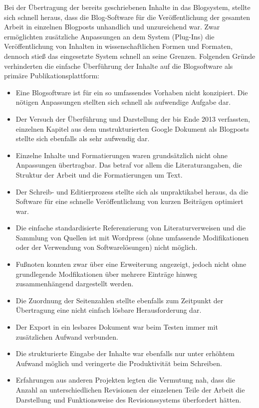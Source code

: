 Bei der Übertragung der bereits geschriebenen Inhalte in das Blogsystem, stellte sich schnell heraus, dass die Blog-Software für die Veröffentlichung der gesamten Arbeit in einzelnen Blogposts unhandlich und unzureichend war. Zwar ermöglichten zusätzliche Anpassungen an dem System (Plug-Ins) die Veröffentlichung von Inhalten in wissenschaftlichen Formen und Formaten, dennoch stieß das eingesetzte System schnell an seine Grenzen. Folgenden Gründe verhinderten die einfache Überführung der Inhalte auf die Blogsoftware als primäre Publikationsplattform:
\begin{itemize}
\item Eine Blogsoftware ist für ein so umfassendes Vorhaben nicht konzipiert. Die nötigen Anpassungen stellten sich schnell als aufwendige Aufgabe dar.
\item Der Versuch der Überführung und Darstellung der bis Ende 2013 verfassten, einzelnen Kapitel aus dem unstrukturierten Google Dokument als Blogposts stellte sich ebenfalls als sehr aufwendig dar.
\item  Einzelne Inhalte und Formatierungen waren grundsätzlich nicht ohne Anpassungen übertragbar. Das betraf vor allem die Literaturangaben, die Struktur der Arbeit und die Formatierungen um Text.
\item Der Schreib- und Editierprozess stellte sich als unpraktikabel heraus, da die Software für eine schnelle Veröffentlichung von kurzen Beiträgen optimiert war.
\item Die einfache standardisierte Referenzierung von Literaturverweisen und die Sammlung von Quellen ist mit Wordpress (ohne umfassende Modifikationen oder der Verwendung von Softwarelösungen) nicht möglich.
\item Fußnoten konnten zwar über eine Erweiterung angezeigt, jedoch nicht ohne grundlegende Modfikationen über mehrere Einträge hinweg zusammenhängend dargestellt werden.
\item Die Zuordnung der Seitenzahlen stellte ebenfalls zum Zeitpunkt der Übertragung eine nicht einfach lösbare Herausforderung dar.
\item Der Export in ein lesbares Dokument war beim Testen immer mit zusätzlichen Aufwand verbunden.
\item Die strukturierte Eingabe der Inhalte war ebenfalls nur unter erhöhtem Aufwand möglich und veringerte die Produktivität beim Schreiben.
\item Erfahrungen aus anderen Projekten legten die Vermutung nah, dass die Anzahl an unterschiedlichen Revisionen der einzelenen Teile der Arbeit die Darstellung und Funktionsweise des Revisionssystems überfordert hätten.
\end{itemize}

